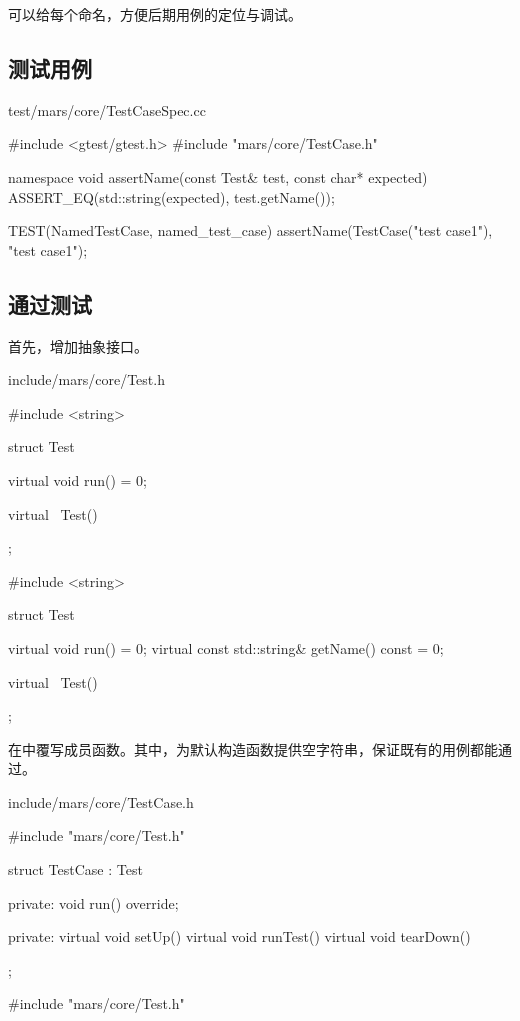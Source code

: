 \begin{content}
可以给每个命名，方便后期用例的定位与调试。

\subsection{测试用例}

\begin{nodiff}{test/mars/core/TestCaseSpec.cc}
 \begin{c++}
#include <gtest/gtest.h>
#include "mars/core/TestCase.h"

namespace {
  void assertName(const Test& test, const char* expected) {
    ASSERT_EQ(std::string(expected), test.getName());
  }
}

TEST(NamedTestCase, named_test_case) {
  assertName(TestCase("test case1"), "test case1");
}
 \end{c++}
\end{nodiff}

\subsection{通过测试}

首先，增加抽象接口。

\begin{diff}{include/mars/core/Test.h}
 \begin{minicpp}
#include <string>

struct Test {
  virtual void run() = 0;
  
  virtual ~Test() {}
};
 \end{minicpp}
 \tcblower
 \begin{minicpp}
#include <string>

struct Test {
  virtual void run() = 0;
  virtual const std::string& getName() const = 0;

  virtual ~Test() {}
};
 \end{minicpp}
\end{diff}

在中覆写成员函数。其中，为默认构造函数提供空字符串，保证既有的用例都能通过。

\begin{diff}{include/mars/core/TestCase.h}
 \begin{minicpp}
#include "mars/core/Test.h"

struct TestCase : Test {
private:
  void run() override;

private:
  virtual void setUp() {}
  virtual void runTest() {}
  virtual void tearDown() {}
};
 \end{minicpp}
\tcblower
 \begin{minicpp}
#include "mars/core/Test.h"


\end{minicpp}
\end{diff}
\end{content}
